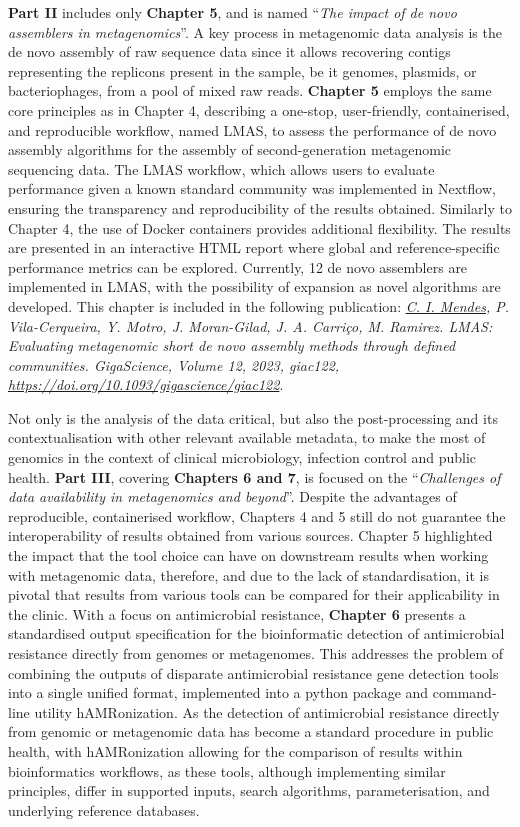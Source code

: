 \textbf{Part II} includes only \textbf{Chapter 5}, and is named “\textit{The impact of de novo assemblers in metagenomics}”. A key process in metagenomic data analysis is the de novo assembly of raw sequence data since it allows recovering contigs representing the replicons present in the sample, be it genomes, plasmids, or bacteriophages, from a pool of mixed raw reads. \textbf{Chapter 5} employs the same core principles as in Chapter 4, describing a one-stop, user-friendly, containerised, and reproducible workflow, named LMAS, to assess the performance of de novo assembly algorithms for the assembly of second-generation metagenomic sequencing data. The LMAS workflow, which allows users to evaluate performance given a known standard community was implemented in Nextflow, ensuring the transparency and reproducibility of the results obtained. Similarly to Chapter 4, the use of Docker containers provides additional flexibility. The results are presented in an interactive HTML report where global and reference-specific performance metrics can be explored. Currently, 12 de novo assemblers are implemented in LMAS, with the possibility of expansion as novel algorithms are developed. This chapter is included in the following publication: \textit{\underline{C. I. Mendes}, P. Vila-Cerqueira, Y. Motro, J. Moran-Gilad, J. A. Carriço, M. Ramirez. LMAS: Evaluating metagenomic short de novo assembly methods through defined communities. GigaScience, Volume 12, 2023, giac122, \url{https://doi.org/10.1093/gigascience/giac122}}.

Not only is the analysis of the data critical, but also the post-processing and its contextualisation with other relevant available metadata, to make the most of genomics in the context of clinical microbiology, infection control and public health. \textbf{Part III}, covering \textbf{Chapters 6 and 7}, is focused on the “\textit{Challenges of data availability in metagenomics and beyond}”. Despite the advantages of reproducible, containerised workflow, Chapters 4 and 5 still do not guarantee the interoperability of results obtained from various sources. Chapter 5 highlighted the impact that the tool choice can have on downstream results when working with metagenomic data, therefore, and due to the lack of standardisation, it is pivotal that results from various tools can be compared for their applicability in the clinic. With a focus on antimicrobial resistance, \textbf{Chapter 6} presents a standardised output specification for the bioinformatic detection of antimicrobial resistance directly from genomes or metagenomes. This addresses the problem of combining the outputs of disparate antimicrobial resistance gene detection tools into a single unified format, implemented into a python package and command-line utility hAMRonization. As the detection of antimicrobial resistance directly from genomic or metagenomic data has become a standard procedure in public health, with hAMRonization allowing for the comparison of results within bioinformatics workflows, as these tools, although implementing similar principles, differ in supported inputs, search algorithms, parameterisation, and underlying reference databases. 

